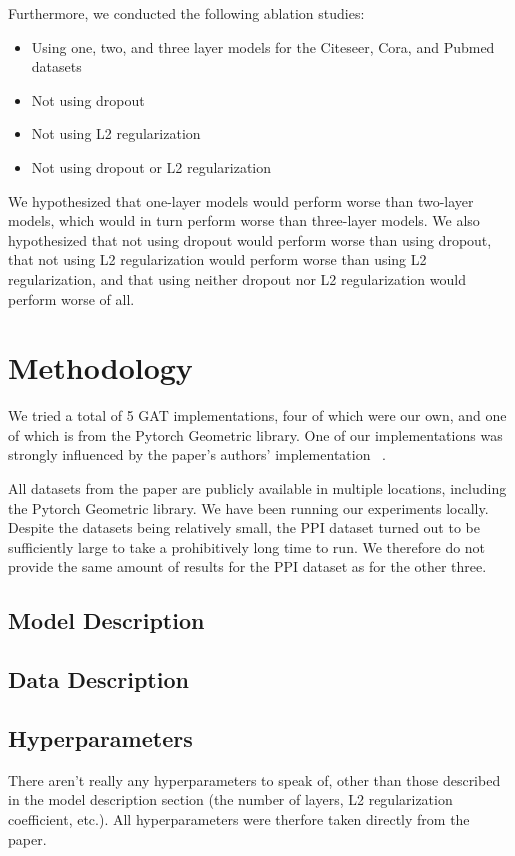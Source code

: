 \documentclass{article}
\begin{document}
    Furthermore, we conducted the following ablation studies:
    \begin{itemize}
        \item Using one, two, and three layer models for the Citeseer, Cora, and Pubmed datasets
	\item Not using dropout
	\item Not using L2 regularization
	\item Not using dropout or L2 regularization
    \end{itemize}
    We hypothesized that one-layer models would perform worse than two-layer models, which would in turn perform worse than three-layer models.
    We also hypothesized that not using dropout would perform worse than using dropout, that not using L2 regularization would perform worse than using L2 regularization, and that using neither dropout nor L2 regularization would perform worse of all.

    \section{Methodology}\label{sec:methodology}
    We tried a total of 5 GAT implementations, four of which were our own, and
    one of which is from the Pytorch Geometric library. One of our
    implementations was strongly influenced by the paper's authors'
    implementation ~\cite{petarvgatgithub}.

    All datasets from the paper are publicly available in multiple locations,
    including the Pytorch Geometric library. We have been running our
    experiments locally. Despite the datasets being relatively small, the PPI
    dataset turned out to be sufficiently large to take a prohibitively long
    time to run. We therefore do not provide the same amount of results for the
    PPI dataset as for the other three.

    \subsection{Model Description}\label{subsec:model-description}
    

    \subsection{Data Description}\label{subsec:data-description}
    

    \subsection{Hyperparameters}\label{subsec:hyperparameters}
    There aren't really any hyperparameters to speak of, other than those
    described in the model description section (the number of layers, L2
    regularization coefficient, etc.). All hyperparameters were therfore taken
    directly from the paper.
\end{document}
